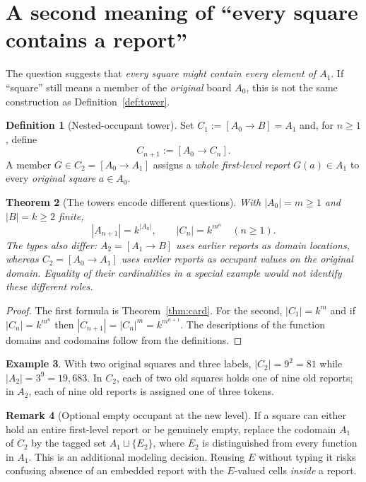 \documentclass[11pt]{article}
\newtheorem{theorem}{Theorem}[section]
\theoremstyle{definition}
\newtheorem{definition}[theorem]{Definition}
\newtheorem{example}[theorem]{Example}
\newtheorem{remark}[theorem]{Remark}
\newcommand{\Fun}[2]{[#1\to #2]}
\begin{document}
\section{A second meaning of ``every square contains a report''}
The question suggests that \emph{every square might contain every element of $A_1$}. If ``square'' still means a member of the \emph{original} board $A_0$, this is not the same construction as Definition~\ref{def:tower}.
\begin{definition}[Nested-occupant tower]\label{def:nested}
Set $C_1:=\Fun{A_0}{B}=A_1$ and, for $n\ge1$, define
\[
\boxed{C_{n+1}:=\Fun{A_0}{C_n}.}
\]
A member $G\in C_2=\Fun{A_0}{A_1}$ assigns a \emph{whole first-level report} $G(a)\in A_1$ to every \emph{original square} $a\in A_0$.
\end{definition}
\begin{theorem}[The towers encode different questions]\label{thm:twotowers}
With $|A_0|=m\ge1$ and $|B|=k\ge2$ finite,
\[
|A_{n+1}|=k^{|A_n|},\qquad |C_n|=k^{m^n}\quad(n\ge1).
\]
The types also differ: $A_2=\Fun{A_1}{B}$ uses earlier \emph{reports as domain locations}, whereas $C_2=\Fun{A_0}{A_1}$ uses earlier reports as \emph{occupant values} on the original domain. Equality of their cardinalities in a special example would not identify these different roles.
\end{theorem}
\begin{proof}The first formula is Theorem~\ref{thm:card}. For the second, $|C_1|=k^m$ and if $|C_n|=k^{m^n}$ then $|C_{n+1}|=|C_n|^m=k^{m^{n+1}}$. The descriptions of the function domains and codomains follow from the definitions.\end{proof}
\begin{example}
With two original squares and three labels, $|C_2|=9^2=81$ while $|A_2|=3^9=19{,}683$. In $C_2$, each of two old squares holds one of nine old reports; in $A_2$, each of nine old reports is assigned one of three tokens.
\end{example}
\begin{remark}[Optional empty occupant at the new level]
If a square can either hold an entire first-level report or be genuinely empty, replace the codomain $A_1$ of $C_2$ by the tagged set $A_1\sqcup\{E_2\}$, where $E_2$ is distinguished from every function in $A_1$. This is an additional modeling decision. Reusing $E$ without typing it risks confusing absence of an embedded report with the $E$-valued cells \emph{inside} a report.
\end{remark}
\end{document}
